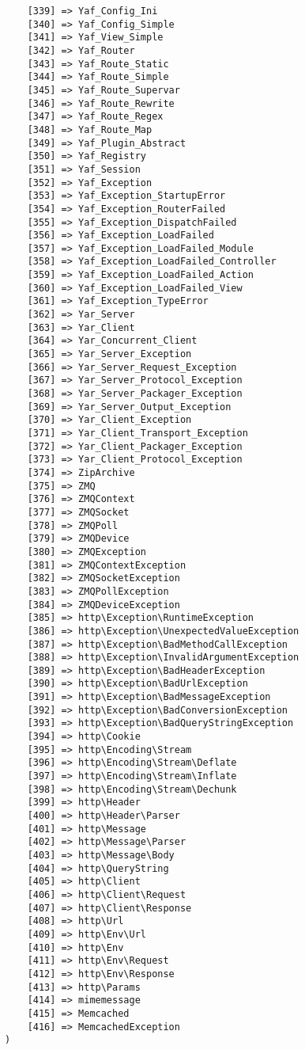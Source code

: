 \begin{lstlisting}
    [339] => Yaf_Config_Ini
    [340] => Yaf_Config_Simple
    [341] => Yaf_View_Simple
    [342] => Yaf_Router
    [343] => Yaf_Route_Static
    [344] => Yaf_Route_Simple
    [345] => Yaf_Route_Supervar
    [346] => Yaf_Route_Rewrite
    [347] => Yaf_Route_Regex
    [348] => Yaf_Route_Map
    [349] => Yaf_Plugin_Abstract
    [350] => Yaf_Registry
    [351] => Yaf_Session
    [352] => Yaf_Exception
    [353] => Yaf_Exception_StartupError
    [354] => Yaf_Exception_RouterFailed
    [355] => Yaf_Exception_DispatchFailed
    [356] => Yaf_Exception_LoadFailed
    [357] => Yaf_Exception_LoadFailed_Module
    [358] => Yaf_Exception_LoadFailed_Controller
    [359] => Yaf_Exception_LoadFailed_Action
    [360] => Yaf_Exception_LoadFailed_View
    [361] => Yaf_Exception_TypeError
    [362] => Yar_Server
    [363] => Yar_Client
    [364] => Yar_Concurrent_Client
    [365] => Yar_Server_Exception
    [366] => Yar_Server_Request_Exception
    [367] => Yar_Server_Protocol_Exception
    [368] => Yar_Server_Packager_Exception
    [369] => Yar_Server_Output_Exception
    [370] => Yar_Client_Exception
    [371] => Yar_Client_Transport_Exception
    [372] => Yar_Client_Packager_Exception
    [373] => Yar_Client_Protocol_Exception
    [374] => ZipArchive
    [375] => ZMQ
    [376] => ZMQContext
    [377] => ZMQSocket
    [378] => ZMQPoll
    [379] => ZMQDevice
    [380] => ZMQException
    [381] => ZMQContextException
    [382] => ZMQSocketException
    [383] => ZMQPollException
    [384] => ZMQDeviceException
    [385] => http\Exception\RuntimeException
    [386] => http\Exception\UnexpectedValueException
    [387] => http\Exception\BadMethodCallException
    [388] => http\Exception\InvalidArgumentException
    [389] => http\Exception\BadHeaderException
    [390] => http\Exception\BadUrlException
    [391] => http\Exception\BadMessageException
    [392] => http\Exception\BadConversionException
    [393] => http\Exception\BadQueryStringException
    [394] => http\Cookie
    [395] => http\Encoding\Stream
    [396] => http\Encoding\Stream\Deflate
    [397] => http\Encoding\Stream\Inflate
    [398] => http\Encoding\Stream\Dechunk
    [399] => http\Header
    [400] => http\Header\Parser
    [401] => http\Message
    [402] => http\Message\Parser
    [403] => http\Message\Body
    [404] => http\QueryString
    [405] => http\Client
    [406] => http\Client\Request
    [407] => http\Client\Response
    [408] => http\Url
    [409] => http\Env\Url
    [410] => http\Env
    [411] => http\Env\Request
    [412] => http\Env\Response
    [413] => http\Params
    [414] => mimemessage
    [415] => Memcached
    [416] => MemcachedException
)
\end{lstlisting}

